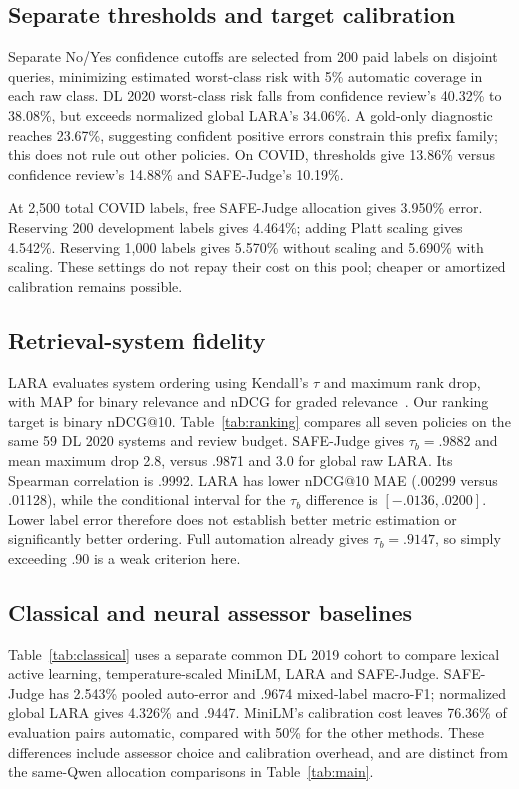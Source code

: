 \documentclass[sigconf,nonacm]{acmart}
\begin{document}
\subsection{Separate thresholds and target calibration}
Separate No/Yes confidence cutoffs are selected from 200 paid labels on disjoint
queries, minimizing estimated worst-class risk with 5\% automatic coverage in
each raw class. DL 2020 worst-class risk falls from confidence review's 40.32\%
to 38.08\%, but exceeds normalized global LARA's 34.06\%. A gold-only diagnostic
reaches 23.67\%, suggesting confident positive errors constrain this prefix
family; this does not rule out other policies. On COVID, thresholds give 13.86\%
versus confidence review's 14.88\% and SAFE-Judge's 10.19\%.

At 2,500 total COVID labels, free SAFE-Judge allocation gives 3.950\% error.
Reserving 200 development labels gives 4.464\%; adding Platt scaling gives
4.542\%. Reserving 1,000 labels gives 5.570\% without scaling and 5.690\% with
scaling. These settings do not repay their cost on this pool; cheaper or
amortized calibration remains possible.

\subsection{Retrieval-system fidelity}
LARA evaluates system ordering using Kendall's $\tau$ and maximum rank drop,
with MAP for binary relevance and nDCG for graded relevance~\cite{lara}.
Our ranking target is binary nDCG@10. Table~\ref{tab:ranking} compares all seven
policies on the same 59 DL 2020 systems and review budget. SAFE-Judge gives
$\tau_b=.9882$ and mean maximum drop 2.8, versus .9871 and 3.0 for global raw
LARA. Its Spearman correlation is .9992. LARA has lower nDCG@10 MAE
(.00299 versus .01128), while the conditional interval for the $\tau_b$
difference is $[-.0136,.0200]$. Lower label error therefore does not establish
better metric estimation or significantly better ordering. Full automation
already gives $\tau_b=.9147$, so simply exceeding .90 is a weak criterion here.

\subsection{Classical and neural assessor baselines}
Table~\ref{tab:classical} uses a separate common DL 2019 cohort to compare
lexical active learning, temperature-scaled MiniLM, LARA and SAFE-Judge.
SAFE-Judge has 2.543\% pooled auto-error and .9674 mixed-label macro-F1;
normalized global LARA gives 4.326\% and .9447. MiniLM's calibration cost leaves
76.36\% of evaluation pairs automatic, compared with 50\% for the other methods.
These differences include assessor choice and calibration overhead, and are
distinct from the same-Qwen allocation comparisons in Table~\ref{tab:main}.
\end{document}
